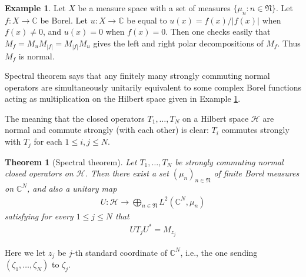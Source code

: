 \documentclass[12pt,b5paper,notitlepage]{article}
\theoremstyle{definition}
\newtheorem{eg}[df]{Example}
\theoremstyle{plain}
\newtheorem{thm}[df]{Theorem}
\newcommand{\fk}{\mathfrak}
\newcommand{\mc}{\mathcal}
\newcommand{\Cbb}{\mathbb C}
\numberwithin{equation}{section}
\begin{document}
\begin{eg}\label{lb33}
Let $X$ be a measure space  with a set of measures $\{\mu_n:n\in\fk N\}$.  Let $f:X\rightarrow \Cbb$ be Borel. Let $u:X\rightarrow\Cbb$ be equal to $u(x)=f(x)/|f(x)|$ when $f(x)\neq 0$, and $u(x)=0$ when $f(x)=0$. Then one checks easily that $M_f=M_uM_{|f|}=M_{|f|}M_u$ gives the left and right polar decompositions of $M_f$. Thus $M_f$ is normal.
\end{eg}




Spectral theorem says that any  finitely many strongly commuting normal operators are simultaneously unitarily equivalent to some complex Borel functions acting as multiplication on the Hilbert space given in Example \ref{lb33}.


The meaning that the closed operators $T_1,\dots,T_N$ on a Hilbert space $\mc H$ are normal and commute strongly (with each other) is clear: $T_i$ commutes strongly with $T_j$ for each $1\leq i,j\leq N$.





\begin{thm}[Spectral theorem]\label{lb35}
Let $T_1,\dots,T_N$ be strongly commuting normal closed operators on $\mc H$. Then there exist a set $(\mu_n)_{n\in\fk N}$ of finite Borel measures on $\Cbb^N$, and also a unitary map
	\begin{align*}
		U:\mc H\rightarrow\bigoplus_{n\in\fk N} L^2(\Cbb^N,\mu_n)
	\end{align*}
	satisfying for every $1\leq j\leq N$ that
	\begin{align}
		UT_jU^*=M_{z_j}
	\end{align}
\end{thm}
Here we let $z_j$ be $j$-th standard coordinate of $\Cbb^N$, i.e., the one sending $(\zeta_1,\dots,\zeta_N)$ to $\zeta_j$. 
\end{document}
